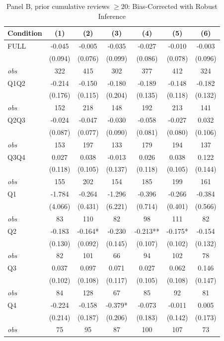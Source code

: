 \begin{table}[!htbp]
\centering
\caption{Panel B, prior cumulative reviews $\geq20$: Bias-Corrected with Robust Inference}
\begin{tabular}{lcccccc}
\toprule
Condition & (1) & (2) & (3) & (4) & (5) & (6) \\
\midrule
FULL & -0.045 & -0.005 & -0.035 & -0.027 & -0.010 & -0.003 \\
 & (0.094) & (0.076) & (0.099) & (0.086) & (0.078) & (0.096) \\
\textit{obs} & 322 & 415 & 302 & 377 & 412 & 324 \\
Q1Q2 & -0.214 & -0.150 & -0.180 & -0.189 & -0.148 & -0.182 \\
 & (0.176) & (0.115) & (0.204) & (0.135) & (0.118) & (0.132) \\
\textit{obs} & 152 & 218 & 148 & 192 & 213 & 141 \\
Q2Q3 & -0.024 & -0.047 & -0.030 & -0.058 & -0.027 & 0.032 \\
 & (0.087) & (0.077) & (0.090) & (0.081) & (0.080) & (0.106) \\
\textit{obs} & 153 & 197 & 133 & 179 & 194 & 137 \\
Q3Q4 & 0.027 & 0.038 & -0.013 & 0.026 & 0.038 & 0.122 \\
 & (0.118) & (0.105) & (0.137) & (0.118) & (0.105) & (0.144) \\
\textit{obs} & 155 & 202 & 154 & 185 & 199 & 161 \\
Q1 & -1.784 & -0.264 & -1.296 & -0.396 & -0.266 & -0.384 \\
 & (4.066) & (0.431) & (6.221) & (0.714) & (0.401) & (0.566) \\
\textit{obs} & 83 & 110 & 82 & 98 & 111 & 82 \\
Q2 & -0.183 & -0.164* & -0.230 & -0.213** & -0.175* & -0.154 \\
 & (0.130) & (0.092) & (0.145) & (0.107) & (0.102) & (0.132) \\
\textit{obs} & 82 & 101 & 66 & 94 & 102 & 78 \\
Q3 & 0.037 & 0.097 & 0.071 & 0.027 & 0.062 & 0.146 \\
 & (0.102) & (0.108) & (0.117) & (0.105) & (0.108) & (0.147) \\
\textit{obs} & 84 & 128 & 67 & 85 & 92 & 81 \\
Q4 & -0.224 & -0.158 & -0.379* & -0.073 & -0.011 & 0.005 \\
 & (0.214) & (0.187) & (0.206) & (0.183) & (0.142) & (0.173) \\
\textit{obs} & 75 & 95 & 87 & 100 & 107 & 73 \\

\end{tabular}
\end{table}
